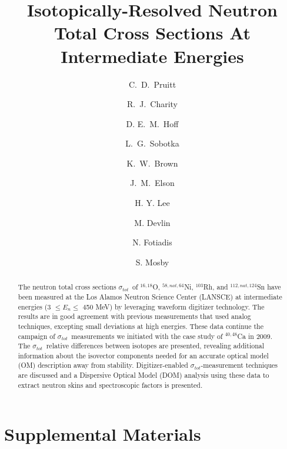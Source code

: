 \documentclass[twocolumn,secnumarabic,amssymb, nobibnotes, aps, prl,
superscriptaddress, nobalancelastpage]{revtex4}
\newcommand{\tot}{\ensuremath{\sigma_{tot}}}
\begin{document}
\begin{abstract}
    The neutron total cross sections \tot\ of $^{16,18}$O,
    $^{58,nat,64}$Ni, $^{103}$Rh, and $^{112,nat,124}$Sn have been measured at the Los Alamos
    Neutron Science Center (LANSCE) at intermediate energies (3 $\leq E_{n}
    \leq$ 450 MeV) by
    leveraging waveform digitizer technology. The results are in good agreement
    with previous measurements that used analog techniques,
    excepting small deviations at high energies. These data
    continue the campaign of
    \tot\ measurements we initiated with the case study of $^{40,48}$Ca in 2009.
    The \tot\ relative differences between isotopes are presented,
    revealing additional information about
    the isovector components needed for an accurate optical model (OM)
    description away from stability. Digitizer-enabled \tot-measurement
    techniques are discussed and a Dispersive Optical Model (DOM)
    analysis using these data to extract neutron skins and spectroscopic factors
    is presented.
\end{abstract}

\title{Isotopically-Resolved Neutron Total Cross Sections At
Intermediate Energies}

\author{C.~D.~Pruitt}  
\author{R.~J.~Charity}
\author{D. E.~M.~Hoff}  
\author{L.~G.~Sobotka}
\author{K.~W.~Brown} 
\author{J.~M.~Elson}

\author{H. Y. Lee}
\author{M. Devlin}
\author{N. Fotiadis}
\author{S. Mosby}
\maketitle

\section{Supplemental Materials}
\end{document}
